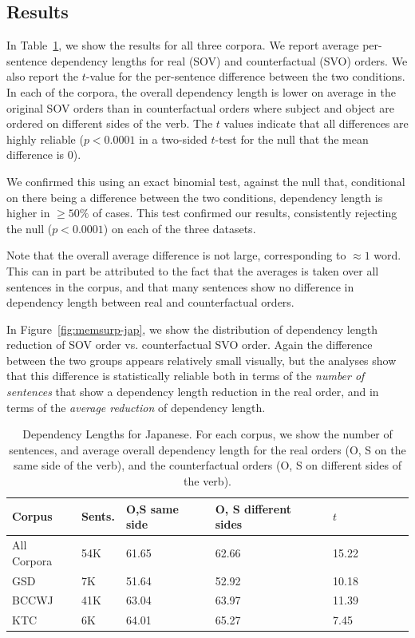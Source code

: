 \documentclass[11pt,a4paper]{article}
\begin{document}
\subsection{Results}
In Table~\ref{tab:depl-resu}, we show the results for all three corpora.
We report average per-sentence dependency lengths for real (SOV) and counterfactual (SVO) orders.
We also report the $t$-value for the per-sentence difference between the two conditions.
In each of the corpora, the overall dependency length is lower on average in the original SOV orders than in counterfactual orders where subject and object are ordered on different sides of the verb.
The $t$ values indicate that all differences are highly reliable ($p < 0.0001$ in a two-sided $t$-test for the null that the mean difference is $0$).

We confirmed this using an exact binomial test, against the null that, conditional on there being a difference between the two conditions, dependency length is higher in  $\geq 50\%$ of cases.
This test confirmed our results, consistently rejecting the null ($p < 0.0001$) on each of the three datasets.


Note that the overall average difference is not large, corresponding to $\approx 1$ word.
This can in part be attributed to the fact that the averages is taken over all sentences in the corpus, and that many sentences show no difference in dependency length between real and counterfactual orders.

In Figure~\ref{fig:memsurp-jap}, we show the distribution of dependency length reduction of SOV order vs. counterfactual SVO order.
Again the difference between the two groups appears relatively small visually, but the analyses show that this difference is statistically reliable both in terms of the \emph{number of sentences} that show a dependency length reduction in the real order, and in terms of the \emph{average reduction} of dependency length.





\begin{table}
\begin{center}
\begin{tabular}{l|l|lllllll}
 Corpus                   &   Sents.                     & O,S same side   & O, S different sides  & $t$   \\ \hline\hline
All Corpora     &  54K     & 61.65 & 62.66 &   15.22   \\ \hline
GSD             &   7K       & 51.64 &  52.92  &  10.18  \\
BCCWJ           &   41K       &    63.04   & 63.97 &  11.39  \\
KTC             &   6K   &  64.01 & 65.27 &  7.45\\ \hline
\end{tabular}
\end{center}
\caption{Dependency Lengths for Japanese. For each corpus, we show the number of sentences, and average overall dependency length for the real orders (O, S on the same side of the verb), and the counterfactual orders (O, S on different sides of the verb).}\label{tab:depl-resu}
\end{table}
\end{document}
